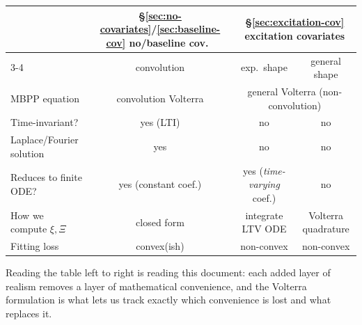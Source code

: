 \begin{center}
\renewcommand{\arraystretch}{1.3}
\begin{tabular}{@{}lccc@{}}
\toprule
 & \S\ref{sec:no-covariates}/\ref{sec:baseline-cov} no/baseline cov.\ & \multicolumn{2}{c}{\S\ref{sec:excitation-cov} excitation covariates}\\
\cmidrule(l){3-4}
 & convolution & exp.\ shape & general shape\\
\midrule
MBPP equation & convolution Volterra & \multicolumn{2}{c}{general Volterra (non-convolution)}\\
Time-invariant? & yes (LTI) & no & no\\
Laplace/Fourier solution & yes & no & no\\
Reduces to finite ODE? & yes (constant coef.) & yes (\emph{time-varying} coef.) & no\\
How we compute $\xi,\Xi$ & closed form & integrate LTV ODE & Volterra quadrature\\
Fitting loss & convex(ish) & non-convex & non-convex\\
\bottomrule
\end{tabular}
\end{center}

\noindent
Reading the table left to right is reading this document: each added layer of
realism removes a layer of mathematical convenience, and the Volterra formulation
is what lets us track exactly which convenience is lost and what replaces it.
